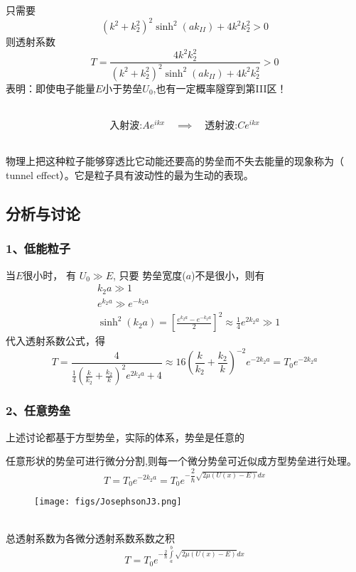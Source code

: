 \begin{frame}
  \frametitle{}
只需要
\[\left(k^2+k_{2}^2\right)^2 \sinh ^2 (a k_{II})+4 k^2 k_{2}^2 > 0 \]
则透射系数
\begin{equation*}
 T=\frac{4 k^2 k_{2}^2}{\left(k^2+k_{2}^2\right)^2 \sinh ^2 (a k_{II})+4 k^2 k_{2}^2} >0    
\end{equation*}
表明：即使电子能量$E$小于势垒$U_0$,也有一定概率隧穿到第III区！

~~\\ 
$$\boxed{\text{入射波:} Ae^{ikx}} \quad \implies \quad \boxed{\text{透射波:} Ce^{ikx}}$$

~~\\ 
物理上把这种粒子能够穿透比它动能还要高的势垒而不失去能量的现象称为\emf[量子隧道效应]（ tunnel effect）。它是粒子具有波动性的最为生动的表现。

\end{frame} 

\subsection{分析与讨论}

\begin{frame}
  \frametitle{ 1、低能粒子}
当$E$很小时， 有 $U_0 \gg E $, 只要 势垒宽度($a$)不是很小，则有 
$$ 
\begin{aligned}
    & k_2 a \gg 1  \\ 
    & e^{k_2 a} \gg e^{-k_2 a} \\
    & \sinh ^2 (k_2 a ) = \left[\frac{e^{k_2 a} - e^{-k_2 a}}{2}\right]^2 \approx \frac{1}{4} e^{2k_2 a} \gg  1 
\end{aligned}
$$ 
代入透射系数公式，得 
$$
T=\frac{4}{\frac{1}{4}\left(\frac{k}{k_2}+\frac{k_2}{k}\right)^2 e^{2 k_2 a}+4} \approx 16 \left(\frac{k}{k_2}+\frac{k_2}{k}\right)^{-2} e^{ - 2 k_2 a} = T_0 e^{ - 2 k_2 a}
$$
\end{frame} 

\begin{frame}
  \frametitle{ 2、任意势垒}
上述讨论都基于方型势垒，实际的体系，势垒是任意的
  \begin{minipage}[b]{0.49\textwidth}
      \vspace{0.3em}
任意形状的势垒可进行微分分割,则每一个微分势垒可近似成方型势垒进行处理。
$$
T=T_0 e^{-2 k_2 a} =T_0 e^{-\dfrac{2}{\hbar} \sqrt{2 \mu(U(x)-E)} d x}
$$
  \end{minipage}
  \begin{minipage}[b]{0.49\textwidth}
        \vspace{0.8em}
   \begin{figure}[h]
      \centering
      \texttt{[image: figs/JosephsonJ3.png]}
   \end{figure} 
  \end{minipage}

~~\\ 
总透射系数为各微分透射系数系数之积
$$ \displaystyle 
T=T_0 e^{-\frac{2}{\hbar} \int\limits_a^b \sqrt{2 \mu(U(x)-E)} d x}
$$
\end{frame} 

